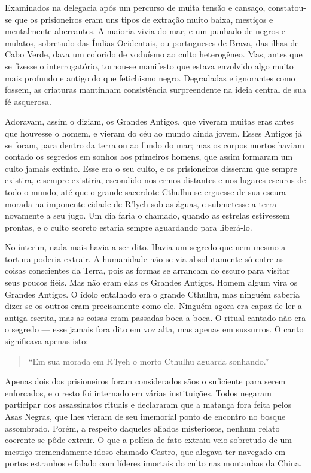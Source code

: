 Examinados na delegacia após um percurso de muita tensão e cansaço,
constatou-se que os prisioneiros eram uns tipos de extração muito baixa,
mestiços e mentalmente aberrantes. A maioria vivia do mar, e um punhado
de negros e mulatos, sobretudo das Índias Ocidentais, ou portugueses de
Brava, das ilhas de Cabo Verde, dava um colorido de voduísmo ao culto
heterogêneo. Mas, antes que se fizesse o interrogatório, tornou-se
manifesto que estava envolvido algo muito mais profundo e antigo 
do que fetichismo negro. Degradadas e ignorantes como fossem, as criaturas
mantinham consistência surpreendente na ideia central de sua fé
asquerosa.

Adoravam, assim o diziam, os Grandes Antigos, que viveram muitas eras
antes que houvesse o homem, e vieram do céu ao mundo ainda jovem.
Esses Antigos já se foram, para dentro da terra ou ao fundo do mar; mas
os corpos mortos haviam contado os segredos em sonhos aos primeiros
homens, que assim formaram um culto jamais extinto. Esse era o seu
culto, e os prisioneiros disseram que sempre existira, e sempre
existiria, escondido nos ermos distantes e nos lugares escuros de todo o
mundo, até que o grande sacerdote Cthulhu se erguesse de sua escura
morada na imponente cidade de R'lyeh sob as águas, e submetesse a terra
novamente a seu jugo. Um dia faria o chamado, quando as estrelas
estivessem prontas, e o culto secreto estaria sempre aguardando para
liberá-lo.

No ínterim, nada mais havia a ser dito. Havia um segredo que nem mesmo a
tortura poderia extrair. A humanidade não se via absolutamente só entre
as coisas conscientes da Terra, pois as formas se arrancam do escuro
para visitar seus poucos fiéis. Mas não eram elas os Grandes Antigos.
Homem algum vira os Grandes Antigos. O ídolo entalhado era o grande
Cthulhu, mas ninguém saberia dizer se os outros eram precisamente como
ele. Ninguém agora era capaz de ler a antiga escrita, mas as coisas eram
passadas boca a boca. O ritual cantado não era o segredo --- esse jamais
fora dito em voz alta, mas apenas em sussurros. O canto significava
apenas isto:

\begin{quote}
  ``Em sua morada em R'lyeh o morto Cthulhu aguarda sonhando.''
\end{quote}

Apenas dois dos prisioneiros foram considerados sãos o suficiente para
serem enforcados, e o resto foi internado em várias instituições. Todos
negaram participar dos assassinatos rituais e declararam que a matança
fora feita pelos Asas Negras, que lhes vieram de seu imemorial ponto de
encontro no bosque assombrado. Porém, a respeito daqueles aliados
misteriosos, nenhum relato coerente se pôde extrair. O que a polícia de
fato extraiu veio sobretudo de um mestiço tremendamente idoso
chamado Castro, que alegava ter navegado em portos estranhos e falado com
líderes imortais do culto nas montanhas da China.

